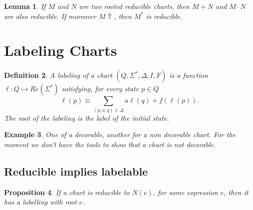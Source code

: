 \documentclass{article}
\newtheorem{definition}{Definition}[section]
\newtheorem{lemma}[definition]{Lemma}
\newtheorem{proposition}[definition]{Proposition}
\newtheorem{example}[definition]{Example}
\begin{document}

\begin{lemma}
  If $M$ and $N$ are two rooted reducible charts, then $M+N$ and $M \cdot N$ are also reducible. 
  If moreover $M \Uparrow$, then $M^*$ is reducible.  
\end{lemma}

\section{Labeling Charts}

\begin{definition}
A \emph{labeling} of a chart $(Q, \Sigma^*, \Delta, I, F)$ is a function 
$\ell:Q \mapsto Re(\Sigma^*)$ satisfying, for every state $p\in Q$
$$\ell(p)\equiv\underset{(p,a, q) \in \Delta}{\sum} a \ell(q) + f(\ell(p)).$$
The \emph{root} of the labeling is the label of the initial state.

\end{definition}



\begin{example}
    One of a decorable, another for a non decorable chart. For the moment we don't have the tools to show that a chart is not decorable.
\end{example}





 \subsection{Reducible implies labelable}
 \begin{proposition}
     If a chart is reducible to $N(e)$, for some expression $e$, then it has a labelling with root $e$. ~\label{prop:reducible-implies-decorable}
 \end{proposition}
\end{document}
